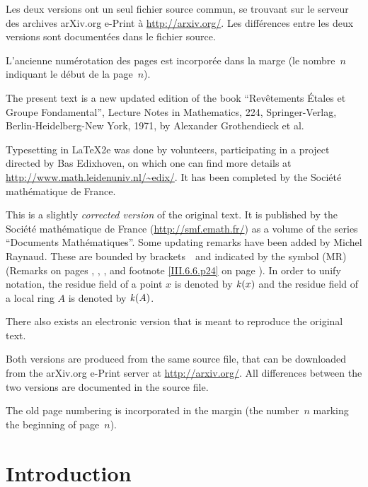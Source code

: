 Les deux versions ont un seul fichier source commun, se trouvant sur
le serveur des archives arXiv.org e-Print \`a
\url{http://arxiv.org/}. Les diff\'erences entre les deux versions
sont document\'ees dans le fichier source.

L'ancienne num\'erotation des pages est incorpor\'ee dans la marge
(le nombre~$n$ indiquant le d\'ebut de la page~$n$).

\vfill
\newpage
The present text is a new
updated
edition of the book ``Rev\^etements \'Etales et
Groupe Fondamental'', Lecture Notes in Mathematics, 224,
Springer-Verlag, Berlin-Heidelberg-New York, 1971, by Alexander
Grothendieck et al.

Typesetting in \LaTeX 2e was done by volunteers, participating in a project directed by Bas Edixhoven, on which one can find more details at
\url{http://www.math.leidenuniv.nl/~edix/}. It has been completed by the Soci\'et\'e \hbox{mathématique} de France.

This is a slightly \emph{corrected version} of the original
text. It is published by the \hbox{Société} \hbox{mathématique} de France (\url{http://smf.emath.fr/}) as a volume of the series ``\hbox{Documents} Math\'ematiques''. Some updating remarks have been added by Michel Raynaud. These are bounded by brackets \lcrochetbf\,\rcrochetbf\ and indicated by the symbol (MR) (Remarks on pages \pageref{X.2.14}, \pageref{XI.1.4}, \pageref{XII.5.6}, \pageref{XIII.2.13} and footnote \ref{III.6.6.p24} on page \pageref{III.6.6.p24}). In order to unify notation, the residue field of a point $x$ is denoted by $\mathit{k}(x)$ and the residue field of a local ring $A$ is denoted by $\mathit{k}(A)$.\par
There also exists an electronic version that is meant to reproduce the original text.

Both versions are produced from the same source file, that can be
downloaded from the arXiv.org e-Print server at
\url{http://arxiv.org/}. All differences between the two versions are
documented in the source file.

The old page numbering is incorporated in the margin (the number~$n$
marking the beginning of page~$n$).

\vfill

\cleardoublepage
\renewcommand{\baselinestretch}{1.1}\normalfont
\chapter*{Introduction}
\thispagestyle{empty}
\label{I.0}


